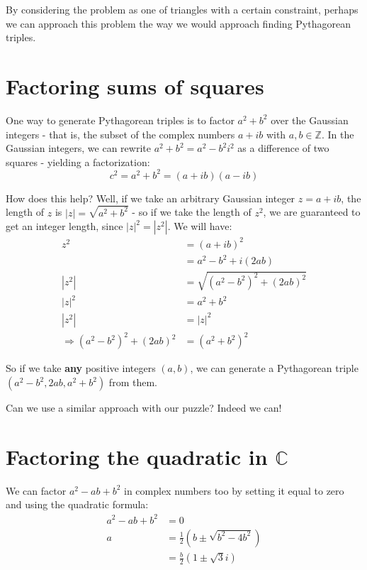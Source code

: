 \documentclass{article}
\begin{document}
By considering the problem as one of triangles with a certain constraint, perhaps we can approach
this problem the way we would approach finding Pythagorean triples.

\section{Factoring sums of squares}

One way to generate Pythagorean triples is to factor $a^2+b^2$ over the Gaussian integers - that is,
the subset of the complex numbers $a+ib$ with $a,b\in \mathbb{Z}$. In the Gaussian integers, we can 
rewrite $ a^2 + b^2 = a^2 - b^2i^2$ as a difference of two squares - yielding a factorization:
\[ c^2 = a^2 + b^2 = (a+ib)(a-ib) \]

How does this help? Well, if we take an arbitrary Gaussian integer $z = a+ib$, the length of $z$ is
$|z| = \sqrt{a^2+b^2}$ - so if we take the length of $z^2$, we are guaranteed to get an integer
length, since $|z|^2 = |z^2|$. We will have:
\begin{equation*}
	\begin{split} 
		z^2 &= (a+ib)^2 \\
		& = a^2-b^2 + i(2ab) \\
		|z^2| &= \sqrt{(a^2-b^2)^2 + (2ab)^2 }\\
		|z|^2 &= a^2 + b^2 \\
		|z^2| &= |z|^2 \\
		\Rightarrow (a^2-b^2)^2 + (2ab)^2 &= (a^2 + b^2)^2
	\end{split}
\end{equation*}

So if we take \textbf{any} positive integers $(a,b)$, we can generate a Pythagorean triple 
$(a^2-b^2, 2ab, a^2+b^2)$ from them.

Can we use a similar approach with our puzzle? Indeed we can!

\section{Factoring the quadratic in $\mathbb{C}$}

We can factor $a^2 - ab + b^2$ in complex numbers too by setting it equal to zero and using 
the quadratic formula:
\begin{equation*}
	\begin{split} 
		a^2 - ab + b^2 &= 0 \\
		a &= \frac{1}{2}\left(b \pm \sqrt{b^2-4b^2}\right) \\
		&= \frac{b}{2}\left(1 \pm \sqrt{3}i\right)
	\end{split}
\end{equation*}
\end{document}
